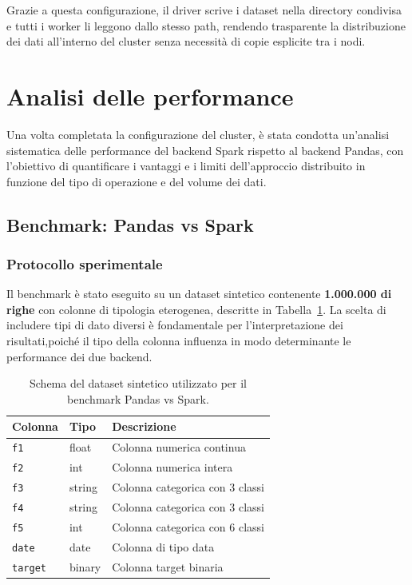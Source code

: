 \documentclass[../main.tex]{subfiles}
\begin{document}
Grazie a questa configurazione, il driver scrive i dataset nella directory condivisa e tutti i worker li leggono dallo stesso path, rendendo trasparente la distribuzione dei dati all'interno del cluster senza necessità di copie esplicite tra i nodi.

\newpage
\section{Analisi delle performance}
\label{sec:analisi_performance}

Una volta completata la configurazione del cluster, è stata condotta un'analisi sistematica delle performance del backend Spark rispetto al backend Pandas, con l'obiettivo di quantificare i vantaggi e i limiti dell'approccio distribuito in funzione del tipo di operazione e del volume dei dati.

\subsection{Benchmark: Pandas vs Spark}
\label{subsec:benchmark}


\subsubsection{Protocollo sperimentale}

Il benchmark è stato eseguito su un dataset sintetico contenente \textbf{1.000.000 di righe} con colonne di tipologia eterogenea, descritte in Tabella~\ref{tab:fake_dataset}. La scelta di includere tipi di dato diversi è fondamentale per l'interpretazione dei risultati,poiché il tipo della colonna influenza in modo determinante le performance dei due backend.

\begin{table}[H]
\centering
\begin{tabular}{lll}
\toprule
\textbf{Colonna} & \textbf{Tipo} & \textbf{Descrizione} \\
\midrule
\texttt{f1}     & float      & Colonna numerica continua \\
\texttt{f2}     & int        & Colonna numerica intera \\
\texttt{f3}     & string     & Colonna categorica con 3 classi \\
\texttt{f4}     & string     & Colonna categorica con 3 classi \\
\texttt{f5}     & int        & Colonna categorica con 6 classi \\
\texttt{date}   & date       & Colonna di tipo data \\
\texttt{target} & binary     & Colonna target binaria \\
\bottomrule
\end{tabular}
\caption{Schema del dataset sintetico utilizzato per il benchmark 
Pandas vs Spark.}
\label{tab:fake_dataset}
\end{table}
\end{document}
